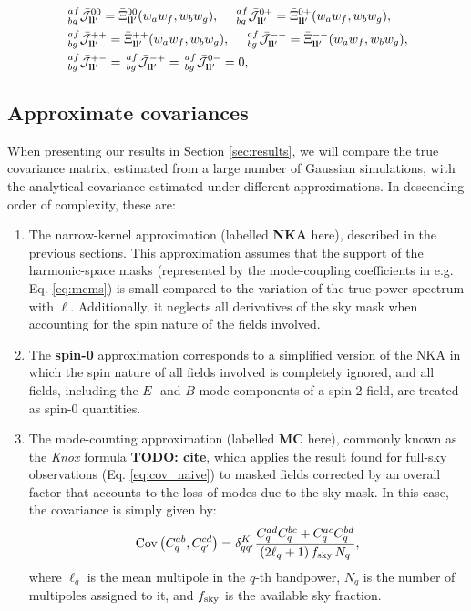 \documentclass[a4paper,11pt]{article}
\newcommand{\todo}[1]{{\bf TODO: #1}}
\begin{document}
        \begin{align}
          &\,^{af}_{bg}\bar{\mathcal{J}}^{00}_{{\bf l}{\bf l}'}=\bar{\Xi}^{00}_{{\bf l}{\bf l}'}(w_aw_f,w_bw_g),\hspace{12pt}
           \,^{af}_{bg}\bar{\mathcal{J}}^{0+}_{{\bf l}{\bf l}'}=\bar{\Xi}^{0+}_{{\bf l}{\bf l}'}(w_aw_f,w_bw_g),\\
          &\,^{af}_{bg}\bar{\mathcal{J}}^{++}_{{\bf l}{\bf l}'}=\bar{\Xi}^{++}_{{\bf l}{\bf l}'}(w_aw_f,w_bw_g),\hspace{12pt}
           \,^{af}_{bg}\bar{\mathcal{J}}^{--}_{{\bf l}{\bf l}'}=\bar{\Xi}^{--}_{{\bf l}{\bf l}'}(w_aw_f,w_bw_g),\\
          &\,^{af}_{bg}\bar{\mathcal{J}}^{+-}_{{\bf l}{\bf l}'}=
           \,^{af}_{bg}\bar{\mathcal{J}}^{-+}_{{\bf l}{\bf l}'}=
           \,^{af}_{bg}\bar{\mathcal{J}}^{0-}_{{\bf l}{\bf l}'}=0,
        \end{align}
        
    \subsection{Approximate covariances}\label{ssec:theory.approx}
      When presenting our results in Section \ref{sec:results}, we will compare the true covariance matrix, estimated from a large number of Gaussian simulations, with the analytical covariance estimated under different approximations. In descending order of complexity, these are:
      \begin{enumerate}
        \item The narrow-kernel approximation (labelled {\bf NKA} here), described in the previous sections. This approximation assumes that the support of the harmonic-space masks (represented by the mode-coupling coefficients in e.g. Eq. \ref{eq:mcms}) is small compared to the variation of the true power spectrum with $\ell$. Additionally, it neglects all derivatives of the sky mask when accounting for the spin nature of the fields involved.
        \item The {\bf spin-0} approximation corresponds to a simplified version of the NKA in which the spin nature of all fields involved is completely ignored, and all fields, including the $E$- and $B$-mode components of a spin-2 field, are treated as spin-0 quantities.
        \item The mode-counting approximation (labelled {\bf MC} here), commonly known as the {\sl Knox} formula \todo{cite}, which applies the result found for full-sky observations (Eq. \ref{eq:cov_naive}) to masked fields corrected by an overall factor that accounts to the loss of modes due to the sky mask. In this case, the covariance is simply given by:
        \begin{equation}\label{eq:cov_naive_bpw}
          {\rm Cov}\left(C^{ab}_q,C^{cd}_{q'}\right)=\delta^K_{qq'}\frac{C^{ad}_qC^{bc}_q+C^{ac}_qC^{bd}_q}{(2\ell_q+1)\,f_{\rm sky}\,N_q},
        \end{equation}
        where $\ell_q$ is the mean multipole in the $q$-th bandpower, $N_q$ is the number of multipoles assigned to it, and $f_{\rm sky}$ is the available sky fraction.
      \end{enumerate}
\end{document}
